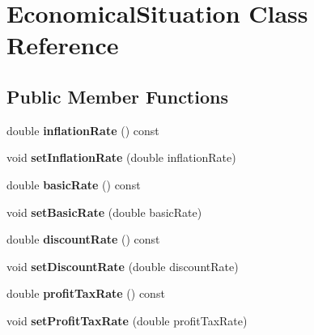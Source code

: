 \hypertarget{class_economical_situation}{}\section{Economical\+Situation Class Reference}
\label{class_economical_situation}
\subsection*{Public Member Functions}
\begin{DoxyCompactItemize}
\item 
\hypertarget{class_economical_situation_acfb33013935115d19f5ac6e90da45c5f}{}double {\bfseries inflation\+Rate} () const \label{class_economical_situation_acfb33013935115d19f5ac6e90da45c5f}

\item 
\hypertarget{class_economical_situation_a266ce3329863b711505ea165f64eee91}{}void {\bfseries set\+Inflation\+Rate} (double inflation\+Rate)\label{class_economical_situation_a266ce3329863b711505ea165f64eee91}

\item 
\hypertarget{class_economical_situation_a7b5a02539cf70475c7423e1f685650e0}{}double {\bfseries basic\+Rate} () const \label{class_economical_situation_a7b5a02539cf70475c7423e1f685650e0}

\item 
\hypertarget{class_economical_situation_a9b20a41fc26c8e730331b645bb842528}{}void {\bfseries set\+Basic\+Rate} (double basic\+Rate)\label{class_economical_situation_a9b20a41fc26c8e730331b645bb842528}

\item 
\hypertarget{class_economical_situation_a7e4860654676d934a6db253d7e37fcd4}{}double {\bfseries discount\+Rate} () const \label{class_economical_situation_a7e4860654676d934a6db253d7e37fcd4}

\item 
\hypertarget{class_economical_situation_a053d360a6ba097bd1b438b5d21bd7bdb}{}void {\bfseries set\+Discount\+Rate} (double discount\+Rate)\label{class_economical_situation_a053d360a6ba097bd1b438b5d21bd7bdb}

\item 
\hypertarget{class_economical_situation_abdcd91b38707d72a13550e450fe48147}{}double {\bfseries profit\+Tax\+Rate} () const \label{class_economical_situation_abdcd91b38707d72a13550e450fe48147}

\item 
\hypertarget{class_economical_situation_a03998405c058bbb8a8e078ef0d101f46}{}void {\bfseries set\+Profit\+Tax\+Rate} (double profit\+Tax\+Rate)\label{class_economical_situation_a03998405c058bbb8a8e078ef0d101f46}

\end{DoxyCompactItemize}


